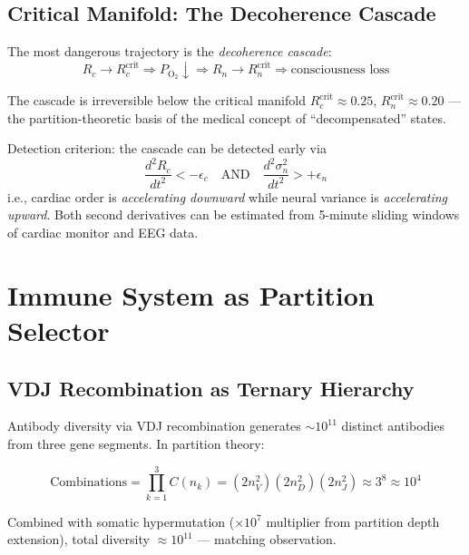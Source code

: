 \documentclass[12pt,a4paper]{article}
\theoremstyle{definition}
\begin{document}
\subsection{Critical Manifold: The Decoherence Cascade}

The most dangerous trajectory is the \emph{decoherence cascade}:
\begin{equation}
R_c \to R_c^{\text{crit}} \Rightarrow P_{\text{O}_2} \downarrow
\Rightarrow R_n \to R_n^{\text{crit}} \Rightarrow \text{consciousness loss}
\end{equation}

The cascade is irreversible below the critical manifold
$R_c^{\text{crit}} \approx 0.25$, $R_n^{\text{crit}} \approx 0.20$ —
the partition-theoretic basis of the medical concept of ``decompensated'' states.

Detection criterion: the cascade can be detected early via
\begin{equation}
\frac{d^2 R_c}{dt^2} < -\epsilon_c \quad \text{AND} \quad
\frac{d^2 \sigma^2_n}{dt^2} > +\epsilon_n
\end{equation}
i.e., cardiac order is \emph{accelerating downward} while neural variance
is \emph{accelerating upward}. Both second derivatives can be estimated from
5-minute sliding windows of cardiac monitor and EEG data.

\section{Immune System as Partition Selector}
\label{sec:immune}

\subsection{VDJ Recombination as Ternary Hierarchy}

Antibody diversity via VDJ recombination generates $\sim 10^{11}$ distinct
antibodies from three gene segments. In partition theory:

\begin{equation}
\text{Combinations} = \prod_{k=1}^3 C(n_k) = (2n_V^2)(2n_D^2)(2n_J^2) \approx 3^8 \approx 10^4
\end{equation}

Combined with somatic hypermutation ($\times 10^7$ multiplier from partition
depth extension), total diversity $\approx 10^{11}$ — matching observation.
\end{document}
